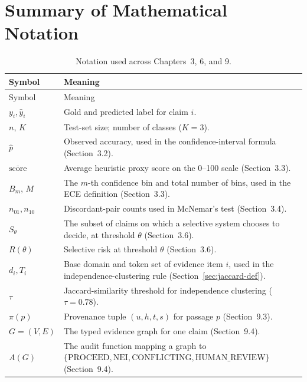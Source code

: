 \documentclass[12pt,a4paper,openany]{report}
\begin{document}
\chapter{Summary of Mathematical Notation}
\begin{longtable}{p{2.4cm}p{10.7cm}}
\caption{Notation used across Chapters~3, 6, and 9.}\\
\toprule Symbol & Meaning \\
\midrule
\endfirsthead
\toprule Symbol & Meaning \\
\midrule
\endhead
$y_i, \hat y_i$ & Gold and predicted label for claim $i$. \\
$n$, $K$ & Test-set size; number of classes ($K=3$). \\
$\hat p$ & Observed accuracy, used in the confidence-interval formula (Section~3.2). \\
$\overline{\mathrm{score}}$ & Average heuristic proxy score on the 0--100 scale (Section~3.3). \\
$B_m$, $M$ & The $m$-th confidence bin and total number of bins, used in the ECE definition (Section~3.3). \\
$n_{01}, n_{10}$ & Discordant-pair counts used in McNemar's test (Section~3.4). \\
$S_\theta$ & The subset of claims on which a selective system chooses to decide, at threshold $\theta$ (Section~3.6). \\
$R(\theta)$ & Selective risk at threshold $\theta$ (Section~3.6). \\
$d_i, T_i$ & Base domain and token set of evidence item $i$, used in the independence-clustering rule (Section~\ref{sec:jaccard-def}). \\
$\tau$ & Jaccard-similarity threshold for independence clustering ($\tau = 0.78$). \\
$\pi(p)$ & Provenance tuple $(u,h,t,s)$ for passage $p$ (Section~9.3). \\
$G=(V,E)$ & The typed evidence graph for one claim (Section~9.4). \\
$A(G)$ & The audit function mapping a graph to $\{\mathrm{PROCEED},\mathrm{NEI},\mathrm{CONFLICTING},\mathrm{HUMAN\_REVIEW}\}$ (Section~9.4). \\
\bottomrule
\end{longtable}
\end{document}

